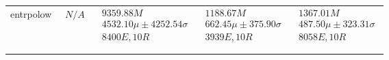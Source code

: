 \begin{tabular}{|l|p{6cm}|p{6cm}|p{6cm}|p{6cm}|}
entrpolow & $\begin{array}{c} N/A \end{array}$ & $\begin{array}{c} 9359.88M \\ 4532.10\mu \pm 4252.54\sigma \\ 8400E, 10R \end{array}$ & $\begin{array}{c} 1188.67M \\ 662.45\mu \pm 375.90\sigma \\ 3939E, 10R \end{array}$ & $\begin{array}{c} 1367.01M \\ 487.50\mu \pm 323.31\sigma \\ 8058E, 10R \end{array}$ \\ \\ \hline
\bottomrule \\ \hline
\end{tabular}
